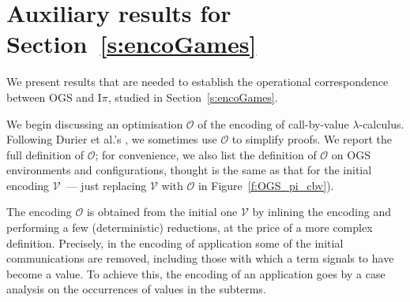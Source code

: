 \documentclass[11pt,a4paper]{amsart}
\theoremstyle{plain}
\theoremstyle{definition}
\theoremstyle{defC}
\theoremstyle{thmC}
\theoremstyle{plain}
\numberwithin{equation}{section}
\newcommand{\opLTS}{opLTS\xspace}  %
\newcommand{\cbvSymb}{{\mathcal {V}}}
\newcommand{\qencV}{{\mathcal O}}  %
\newcommand{\Intp}{\mbox{I$\pi$}\xspace}   %
\newcommand{\piI}{\Intp}   %
\theoremstyle{plain}
\theoremstyle{definition}
\begin{document}



\section{Auxiliary results for Section~\ref{s:encoGames}}
\label{a:oc}


We present results that are needed to establish the operational correspondence between 
OGS and \piI, studied in Section~\ref{s:encoGames}. 


We begin discussing an optimisation
$\qencV$ of
the  encoding of 
 call-by-value $\lambda$-calculus.
Following 
 Durier et al.'s 
\cite{DurierHS18}, 
we sometimes use $\qencV$  to simplify proofs. 
We report the 
full definition of   $\qencV$;
for  convenience, we also list the 
 definition of $\qencV$  on 
 OGS environments and configurations, thought  is the same as 
that for the initial encoding $\cbvSymb$~--- just replacing $\cbvSymb$ with 
 $\qencV$ in Figure~\ref{f:OGS_pi_cbv}). 


The encoding 
 $\qencV$
 is 
obtained  from the  initial one 
$\cbvSymb$ 
by inlining the encoding and performing a few (deterministic) reductions,
at the price of 
 a more complex definition.  Precisely, in the encoding of application 
 some of the initial
communications are removed, including those with which a term signals to have become a value. 
To achieve this,  the encoding of an 
application  goes by a case analysis
on the occurrences of values in the subterms.
\end{document}
